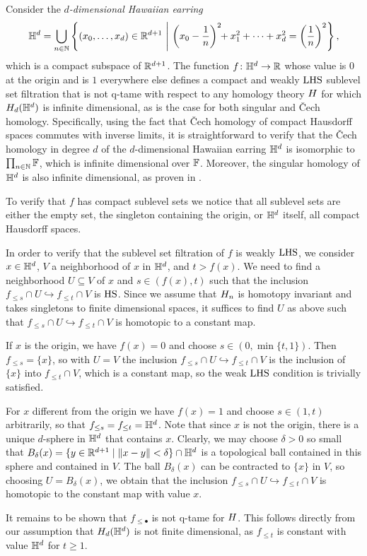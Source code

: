 \begin{example} \label{e:counterexample}
	Consider the \emph{$d$-dimensional Hawaiian earring}
	\begin{equation*}
		\mathbb{H}^d = \bigcup_{n \in \mathbb{N}} \left\{ (x_0, \dots, x_d) \in \mathbb{R}^{d+1} \ \middle | \ \left( x_0 - \frac{1}{n} \right)^2 \!\! + x_1^2 + \dots + x_d^2 = \left( \frac{1}{n} \right)^2 \right\},
	\end{equation*}
	which is a compact subspace of $\mathbb{R}^{d+1}$.
	The function $f \colon \mathbb{H}^d \to \mathbb{R}$ whose value is $0$ at the origin and is $1$ everywhere else defines a compact and weakly $\mathrm{LHS}$ sublevel set filtration that is not q-tame with respect to any homology theory $H$ for which $H_{d}(\mathbb{H}^d)$ is infinite dimensional, as is the case for both singular and \v Cech homology.
	Specifically, using the fact that \v{C}ech homology of compact Hausdorff spaces commutes with inverse limits, it is straightforward to verify that the \v{C}ech homology in degree $d$ of the $d$-dimensional Hawaiian earring $\mathbb{H}^d$ is isomorphic to $\prod_{n\in\mathbb{N}}\mathbb{F}$, which is infinite dimensional over $\mathbb{F}$.
	Moreover, the singular homology of $\mathbb{H}^d$ is also infinite dimensional, as proven in \cite{Barratt.1962}.


	To verify that $f$ has compact sublevel sets we notice that all sublevel sets are either the empty set, the singleton containing the origin, or $\mathbb{H}^d$ itself, all compact Hausdorff spaces.

	In order to verify that the sublevel set filtration of $f$ is weakly $\mathrm{LHS}$, we consider $x \in \mathbb{H}^d$, $V$ a neighborhood of $x$ in $\mathbb{H}^d$, and $t > f(x)$.
	We need to find a neighborhood $U \subseteq V$ of $x$ and $s \in (f(x), t)$ such that the inclusion $f_{\leq s} \cap U \hookrightarrow f_{\leq t} \cap V$ is $\mathrm{HS}$.
	Since we assume that $H_{n}$ is homotopy invariant and takes singletons to finite dimensional spaces, it suffices to find $U$ as above such that $f_{\leq s} \cap U \hookrightarrow f_{\leq t} \cap V$ is homotopic to a constant map.

	If $x$ is the origin, we have $f(x) = 0$ and choose $s \in (0, \min\{t, 1\})$.
	Then $f_{\leq s} = \{x\}$, so with $U = V$ the inclusion $f_{\leq s} \cap U \hookrightarrow f_{\leq t} \cap V$ is the inclusion of $\{x\}$ into $f_{\leq t} \cap V$, which is a constant map, so the weak $\mathrm{LHS}$ condition is trivially satisfied.

	For $x$ different from the origin we have $f(x) = 1$ and choose $s \in (1,t)$ arbitrarily, so that $f_{\leq s} = f_{\leq t} = \mathbb{H}^d$.
	Note that since $x$ is not the origin, there is a unique $d$-sphere in $\mathbb{H}^d$ that contains $x$.
	Clearly, we may choose $\delta > 0$ so small that $B_{\delta}(x) = \{y \in \mathbb{R}^{d+1} \mid \Vert x - y \Vert < \delta\} \cap \mathbb{H}^d$ is a topological ball contained in this sphere and contained in $V$.
	The ball $B_\delta(x)$ can be contracted to $\{x\}$ in $V$, so choosing $U = B_{\delta}(x)$, we obtain that the inclusion $f_{\leq s} \cap U \hookrightarrow f_{\leq t} \cap V$ is homotopic to the constant map with value $x$.

	It remains to be shown that $f_{\leq \bullet}$ is not q-tame for $H$.
	This follows directly from our assumption that $H_{d}(\mathbb{H}^d)$ is not finite dimensional, as $f_{\leq t}$ is constant with value $\mathbb{H}^d$ for $t \geq 1$.
\end{example}